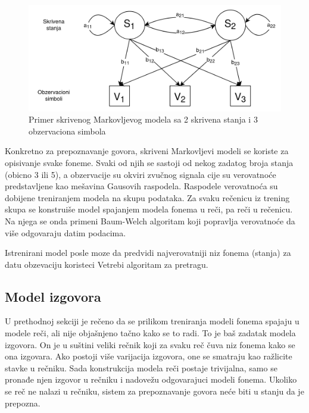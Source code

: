 \documentclass[a4paper]{article}
\begin{document}
\begin{figure}[h!]
  \begin{center}
    \includegraphics[scale=0.3]{hmm.png}
  \end{center}
  \caption{Primer skrivenog Markovljevog modela sa 2 skrivena stanja i 3 obzervaciona simbola}
  \label{fig:hmm}
\end{figure}

Konkretno za prepoznavanje govora, skriveni Markovljevi modeli se koriste za opisivanje svake foneme.
Svaki od njih se sastoji od nekog zadatog broja stanja (obicno 3 ili 5), a obzervacije su okviri zvučnog signala cije su verovatnoće predstavljene kao mešavina Gausovih raspodela.
Raspodele verovatnoća su dobijene treniranjem modela na skupu podataka.
Za svaku rečenicu iz trening skupa se konstruiše model spajanjem modela fonema u reči, pa reči u rečenicu.
Na njega se onda primeni Baum-Welch algoritam koji popravlja verovatnoće da više odgovaraju datim podacima.

Istrenirani model posle moze da predvidi najverovatniji niz fonema (stanja) za datu obzevaciju koristeci Vetrebi algoritam za pretragu.

\subsection{Model izgovora}
U prethodnoj sekciji je rečeno da se prilikom treniranja modeli fonema spajaju u modele reči, ali nije objašnjeno tačno kako se to radi.
To je baš zadatak modela izgovora.
On je u suštini veliki rečnik koji za svaku reč čuva niz fonema kako se ona izgovara.
Ako postoji više varijacija izgovora, one se smatraju kao ražlicite stavke u rečniku.
Sada konstrukcija modela reči postaje trivijalna, samo se pronađe njen izgovor u rečniku i nadovežu odgovarajuci modeli fonema.
Ukoliko se reč ne nalazi u rečniku, sistem za prepoznavanje govora neće biti u stanju da je prepozna.
\end{document}
